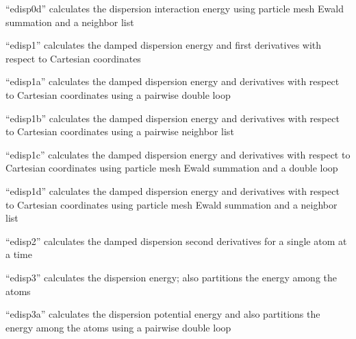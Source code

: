 \documentclass[letterpaper,11pt,english]{sphinxmanual}
\begin{document}
\sphinxAtStartPar
{}

\sphinxAtStartPar
“edisp0d” calculates the dispersion interaction energy using particle mesh Ewald summation and a neighbor list

\sphinxAtStartPar
{}

\sphinxAtStartPar
“edisp1” calculates the damped dispersion energy and first derivatives with respect to Cartesian coordinates

\sphinxAtStartPar
{}

\sphinxAtStartPar
“edisp1a” calculates the damped dispersion energy and derivatives with respect to Cartesian coordinates using a pairwise double loop

\sphinxAtStartPar
{}

\sphinxAtStartPar
“edisp1b” calculates the damped dispersion energy and derivatives with respect to Cartesian coordinates using a pairwise neighbor list

\sphinxAtStartPar
{}

\sphinxAtStartPar
“edisp1c” calculates the damped dispersion energy and derivatives with respect to Cartesian coordinates using particle mesh Ewald summation and a double loop

\sphinxAtStartPar
{}

\sphinxAtStartPar
“edisp1d” calculates the damped dispersion energy and derivatives with respect to Cartesian coordinates using particle mesh Ewald summation and a neighbor list

\sphinxAtStartPar
{}

\sphinxAtStartPar
“edisp2” calculates the damped dispersion second derivatives for a single atom at a time

\sphinxAtStartPar
{}

\sphinxAtStartPar
“edisp3” calculates the dispersion energy; also partitions the energy among the atoms

\sphinxAtStartPar
{}

\sphinxAtStartPar
“edisp3a” calculates the dispersion potential energy and also partitions the energy among the atoms using a pairwise double loop

\sphinxAtStartPar
{}
\end{document}
